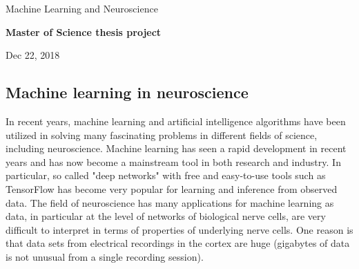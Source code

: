 \documentclass[%
oneside,                 %
final,                   %
10pt]{article}
\begin{document}

\newcommand{\exercisesection}[1]{\subsection*{#1}}






\thispagestyle{empty}

\begin{center}
{\LARGE\bf
\begin{spacing}{1.25}
Machine Learning and Neuroscience
\end{spacing}
}
\end{center}


\begin{center}
{\bf Master of Science thesis project${}^{}$} \\ [0mm]
\end{center}

\begin{center}
\end{center}
    

\begin{center}
Dec 22, 2018
\end{center}

\vspace{1cm}


\subsection*{Machine learning in neuroscience}

In recent years, machine learning and artificial intelligence
algorithms have been utilized in solving many fascinating problems in
different fields of science, including neuroscience.  Machine learning
has seen a rapid development in recent years and has now become a
mainstream tool in both research and industry. In particular, so
called "deep networks" with free and easy-to-use tools such as
TensorFlow has become very popular for learning and inference from
observed data.  The field of neuroscience has many applications for
machine learning as data, in particular at the level of networks of
biological nerve cells, are very difficult to interpret in terms of
properties of underlying nerve cells. One reason is that data sets
from electrical recordings in the cortex are huge (gigabytes of data
is not unusual from a single recording session).
\end{document}

